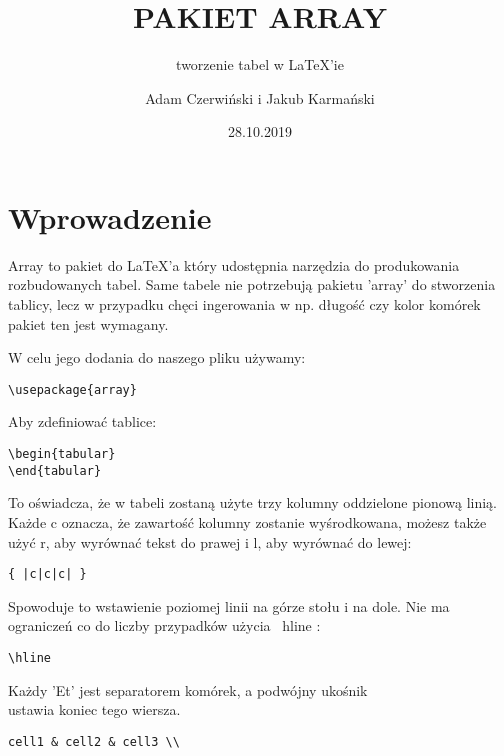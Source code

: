 \documentclass{beamer}
\title{PAKIET ARRAY}
\subtitle{tworzenie tabel w LaTeX'ie}
\author{Adam Czerwiński i Jakub Karmański}
\institute{POLSL}
\date{28.10.2019}
\begin{document}
 
\maketitle
 
\tableofcontents
 
\section{Wprowadzenie}

\begin{frame}[fragile]
Array to pakiet do LaTeX’a który udostępnia narzędzia do produkowania rozbudowanych tabel. 
Same tabele nie potrzebują pakietu 'array' do stworzenia tablicy, lecz w przypadku chęci ingerowania w np. długość czy kolor komórek pakiet ten jest wymagany.

W celu jego dodania do naszego pliku używamy:

\begin{lstlisting}
\usepackage{array}
\end{lstlisting}
\end{frame}

\begin{frame}[fragile]

Aby zdefiniować tablice:
\begin{lstlisting}
\begin{tabular}
\end{tabular} 
\end{lstlisting}
To oświadcza, że w tabeli zostaną użyte trzy kolumny oddzielone pionową linią. Każde c oznacza, że zawartość kolumny zostanie wyśrodkowana, możesz także użyć r, aby wyrównać tekst do prawej i l, aby wyrównać do lewej:
\begin{lstlisting}
{ |c|c|c| }
\end{lstlisting}
Spowoduje to wstawienie poziomej linii na górze stołu i na dole. Nie ma ograniczeń co do liczby przypadków użycia \ hline :
\begin{lstlisting}
\hline
\end{lstlisting}
Każdy 'Et' jest separatorem komórek, a podwójny ukośnik \\ ustawia koniec tego wiersza.
\begin{lstlisting}
cell1 & cell2 & cell3 \\
\end{lstlisting}
\end{frame}
\end{document}
